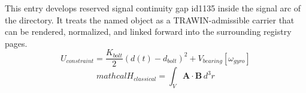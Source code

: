 
\begin{tzpsnapshot}
\end{tzpsnapshot}

This entry develops reserved signal continuity gap id1135 inside the signal arc of the directory. It treats the named object as a TRAWIN-admissible carrier that can be rendered, normalized, and linked forward into the surrounding registry pages.
\[
U_{constraint} = \frac{K_{bolt}}{2}(d(t)-d_{bolt})^{2} + V_{bearing}[\omega_{gyro}]
\]
\[
mathcal{H}_{classical} = \int_V \mathbf{A} \cdot \mathbf{B} \, d^3r
\]

